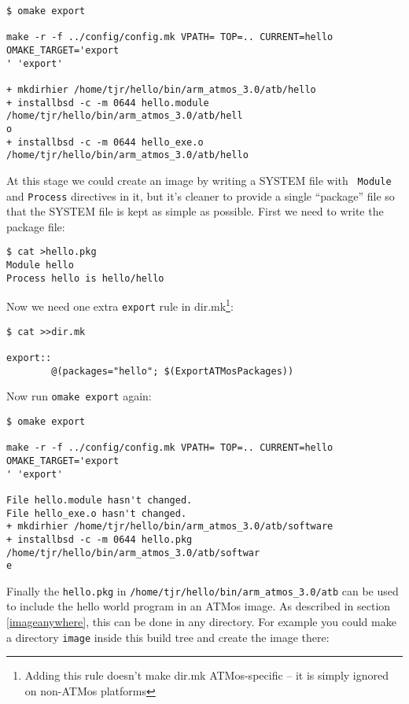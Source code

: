 \documentclass[11pt,twoside,onecolumn]{article}
\begin{document}
{\footnotesize \begin{verbatim}
$ omake export

make -r -f ../config/config.mk VPATH= TOP=.. CURRENT=hello OMAKE_TARGET='export
' 'export'

+ mkdirhier /home/tjr/hello/bin/arm_atmos_3.0/atb/hello 
+ installbsd -c -m 0644 hello.module /home/tjr/hello/bin/arm_atmos_3.0/atb/hell
o 
+ installbsd -c -m 0644 hello_exe.o /home/tjr/hello/bin/arm_atmos_3.0/atb/hello
\end{verbatim}}

At this stage we could create an image by writing a SYSTEM file with {\tt
Module} and {\tt Process} directives in it, but it's cleaner to provide a
single ``package'' file so that the SYSTEM file is kept as simple as possible.
First we need to write the package file:

{\footnotesize \begin{verbatim}
$ cat >hello.pkg
Module hello
Process hello is hello/hello
\end{verbatim}}

Now we need one extra {\tt export} rule in dir.mk\footnote{Adding this rule
doesn't make dir.mk ATMos-specific -- it is simply ignored on non-ATMos
platforms}:

{\footnotesize \begin{verbatim}
$ cat >>dir.mk

export::
        @(packages="hello"; $(ExportATMosPackages))
\end{verbatim}}

Now run {\tt omake export} again:

{\footnotesize \begin{verbatim}
$ omake export

make -r -f ../config/config.mk VPATH= TOP=.. CURRENT=hello OMAKE_TARGET='export
' 'export'

File hello.module hasn't changed.
File hello_exe.o hasn't changed.
+ mkdirhier /home/tjr/hello/bin/arm_atmos_3.0/atb/software 
+ installbsd -c -m 0644 hello.pkg /home/tjr/hello/bin/arm_atmos_3.0/atb/softwar
e 
\end{verbatim}}

Finally the {\tt hello.pkg} in \verb|/home/tjr/hello/bin/arm_atmos_3.0/atb| can
be used to include the hello world program in an ATMos image.  As described in
section \ref{imageanywhere}, this can be done in any directory.  For example
you could make a directory {\tt image} inside this build tree and create the
image there:
\end{document}
